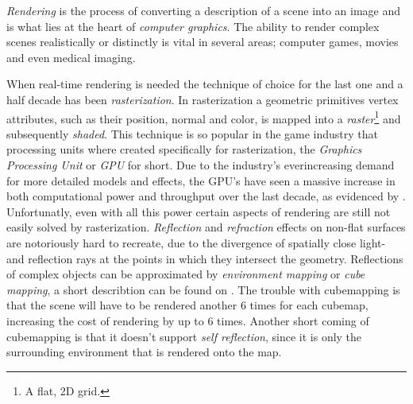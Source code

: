 






\textit{Rendering} is the process of converting a description of a
scene into an image and is what lies at the heart of \textit{computer
  graphics}. The ability to render complex scenes realistically or
distinctly is vital in several areas; computer games, movies and even
medical imaging.



When real-time rendering is needed the technique of choice for the
last one and a half decade has been \textit{rasterization}. In
rasterization a geometric primitives vertex attributes, such as their
position, normal and color, is mapped into a
\textit{raster}\footnote{A flat, 2D grid.} and subsequently
\textit{shaded}. This technique is so popular in the game industry
that processing units where created specifically for rasterization,
the \textit{Graphics Processing Unit} or \textit{GPU} for short. Due
to the industry's everincreasing demand for more detailed models and
effects, the GPU's have seen a massive increase in both computational
power and throughput over the last decade, as evidenced by
. Unfortunatly, even with all this power certain
aspects of rendering are still not easily solved by
rasterization. \textit{Reflection} and \textit{refraction} effects on
non-flat surfaces are notoriously hard to recreate, due to the
divergence of spatially close light- and reflection rays at the points
in which they intersect the geometry. Reflections of complex objects
can be approximated by \textit{environment mapping} or \textit{cube
  mapping}, a short describtion can be found on
. The trouble with cubemapping is that the scene
will have to be rendered another 6 times for each cubemap, increasing
the cost of rendering by up to 6 times. Another short coming of
cubemapping is that it doesn't support \textit{self reflection}, since
it is only the surrounding environment that is rendered onto the map.

